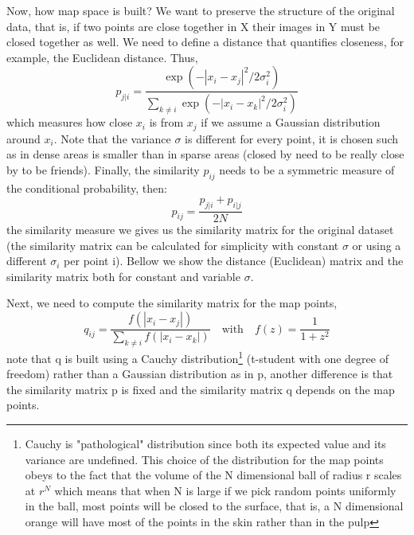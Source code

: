 \documentclass[11pt]{article}
\theoremstyle{definition}
\theoremstyle{remark}
\begin{document}
{Now, how  map space is built? We want to preserve the structure of the original data, that is, if two points are close together in X their images in Y must be closed together as well. We need to define a distance that quantifies closeness, for example, the Euclidean distance. Thus, 
\begin{equation} \label{eq:tsne}
p_{j|i} = \frac{\exp\left(-\left| x_i - x_j\right|^2 \big/ 2\sigma_i^2\right)}{\displaystyle\sum_{k \neq i} \exp\left(-\left| x_i - x_k\right|^2 \big/ 2\sigma_i^2\right)}
\end{equation}
which measures how close $x_i$ is from $x_j$ if we assume a Gaussian distribution around $x_i$. Note that the variance $\sigma$ is different for every point, it is chosen such as in dense areas is smaller than in sparse areas (closed by need to be really close by to be friends). 
Finally, the similarity $p_{ij}$ needs to be a symmetric measure of the conditional probability, then:
\begin{equation} \label{eq:tsne2}
p_{ij} = \frac{p_{j|i} + p_{i|j}}{2N}
\end{equation}
the similarity measure we gives us the similarity matrix for the original dataset (the similarity matrix can be calculated for simplicity with constant $\sigma$ or using a different $\sigma_i$ per point i).
Bellow we show the distance (Euclidean) matrix and the similarity matrix both for constant and variable $\sigma$.

Next, we need to compute the similarity matrix for the map points,
\begin{equation}
q_{ij} = \frac{f(\left| x_i - x_j\right|)}{\displaystyle\sum_{k \neq i} f(\left| x_i - x_k\right|)} \quad \textrm{with} \quad f(z) = \frac{1}{1+z^2}
\end{equation}
note that q is built using a Cauchy distribution\footnote{Cauchy is "pathological" distribution since both its expected value and its variance are undefined. This choice of the distribution for the map points obeys to the fact that the volume of the N dimensional ball of radius r scales at $r^N$ which means that when N is large if we pick random points uniformly in the ball, most points will be closed to the surface, that is, a N dimensional orange will have most of the points in the skin rather than in the pulp} 
(t-student with one degree of freedom) rather than a Gaussian distribution as in p, another difference is that the similarity matrix p is fixed and the similarity matrix q depends on the map points. 


}
\end{document}
